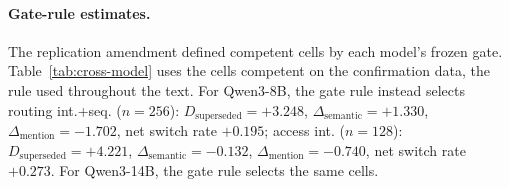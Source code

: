 \paragraph{Gate-rule estimates.} The replication amendment defined competent cells by each model\textquoteright s frozen gate. Table~\ref{tab:cross-model} uses the cells competent on the confirmation data, the rule used throughout the text. For Qwen3-8B, the gate rule instead selects routing int.+seq. ($n=256$): $D_{\mathrm{superseded}}=+3.248$, $\Delta_{\mathrm{semantic}}=+1.330$, $\Delta_{\mathrm{mention}}=-1.702$, net switch rate $+0.195$; access int. ($n=128$): $D_{\mathrm{superseded}}=+4.221$, $\Delta_{\mathrm{semantic}}=-0.132$, $\Delta_{\mathrm{mention}}=-0.740$, net switch rate $+0.273$. For Qwen3-14B, the gate rule selects the same cells.
